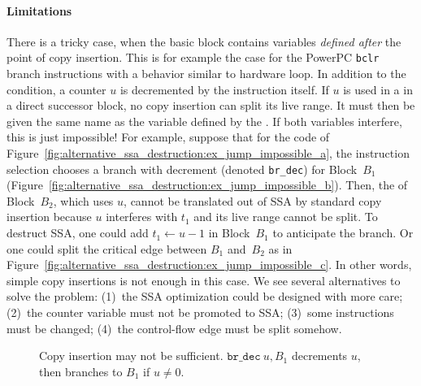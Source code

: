 \paragraph{Limitations}
There is a tricky case, when the basic block contains variables \emph{defined after} the point of copy insertion. 
This is for example the case for the PowerPC \texttt{bclr} branch instructions with a behavior similar to hardware loop. 
In addition to the condition, a counter $u$ is decremented by the instruction itself. 
If $u$ is used in a \phifun in a direct successor block, no copy insertion can split its live range. 
It must then be given the same name as the variable defined by the \phifun. 
If both variables interfere, this is just impossible! 
For example, suppose that for the code of Figure~\ref{fig:alternative_ssa_destruction:ex_jump_impossible_a}, the instruction selection chooses a branch with decrement (denoted \texttt{br\_dec}) for Block~$B_1$ (Figure~\ref{fig:alternative_ssa_destruction:ex_jump_impossible_b}). 
Then, the \phifun of Block~$B_2$, which uses $u$, cannot be translated out of SSA by standard copy insertion because $u$ interferes with $t_1$ and its live range cannot be split. 
To destruct SSA, one could add $t_1\gets u-1$ in Block~$B_1$ to anticipate the branch. 
Or one could split the critical edge between $B_1$ and~$B_2$ as in Figure~\ref{fig:alternative_ssa_destruction:ex_jump_impossible_c}. 
In other words, simple copy insertions is not enough in this case.
We see several alternatives to solve the problem:
(1)~the SSA optimization could be designed with more care;
(2)~the counter variable must not be promoted to SSA;
(3)~some instructions must be changed;
(4)~the control-flow edge must be split somehow. 

\begin{figure}[h]
\hfill
{}
\hfill
{}
\caption{Copy insertion may not be sufficient. $\texttt{br\_dec}\ u,B_1$ decrements $u$, then branches to $B_1$ if $u\neq 0$.\label{fig:alternative_ssa_destruction:ex_jump_impossible}}
\end{figure}

